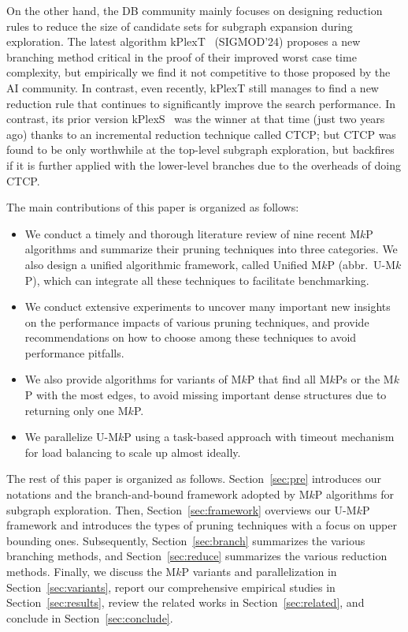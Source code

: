 \documentclass[sigconf, nonacm]{acmart}
\begin{document}
On the other hand, the DB community mainly focuses on designing reduction rules to reduce the size of candidate sets for subgraph expansion during exploration. The latest algorithm kPlexT~\cite{kPlexT} (SIGMOD'24) proposes a new branching method critical in the proof of their improved worst case time complexity, but empirically we find it not competitive to those proposed by the AI community. In contrast, even recently, kPlexT still manages to find a new reduction rule that continues to significantly improve the search performance. In contrast, its prior version kPlexS~\cite{kPlexS} was the winner at that time (just two years ago) thanks to an incremental reduction technique called CTCP; but CTCP was found to be only worthwhile at the top-level subgraph exploration, but backfires if it is further applied with the lower-level branches due to the overheads of doing CTCP.

The main contributions of this paper is organized as follows:
\begin{itemize}[leftmargin=2.7em]
\item We conduct a timely and thorough literature review of nine recent M$k$P algorithms and summarize their pruning techniques into three categories. We also design a unified algorithmic framework, called Unified M$k$P (abbr.\ U-M$k$P), which can integrate all these techniques to facilitate benchmarking.
\item We conduct extensive experiments to uncover many important new insights on the performance impacts of various pruning techniques, and provide recommendations on how to choose among these techniques to avoid performance pitfalls.
\item We also provide algorithms for variants of M$k$P that find all M$k$Ps or the M$k$P with the most edges, to avoid missing important dense structures due to returning only one M$k$P.
\item We parallelize U-M$k$P using a task-based approach with timeout mechanism for load balancing to scale up almost ideally.
\end{itemize}

The rest of this paper is organized as follows. 
Section~\ref{sec:pre} introduces our notations and the branch-and-bound framework adopted by M$k$P algorithms for subgraph exploration. 
Then, Section~\ref{sec:framework} overviews our U-M$k$P framework and introduces the types of pruning techniques with a focus on upper bounding ones.
Subsequently, Section~\ref{sec:branch} summarizes the various branching methods, and Section~\ref{sec:reduce} summarizes the various reduction methods. 
Finally, we discuss the M$k$P variants and parallelization in Section~\ref{sec:variants}, report our comprehensive empirical studies in Section~\ref{sec:results}, review the related works in Section~\ref{sec:related}, and conclude in Section~\ref{sec:conclude}.
\end{document}
